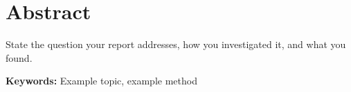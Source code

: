 \section*{Abstract}

State the question your report addresses, how you investigated it, and what you found.

\textbf{Keywords:} Example topic, example method

\newpage
